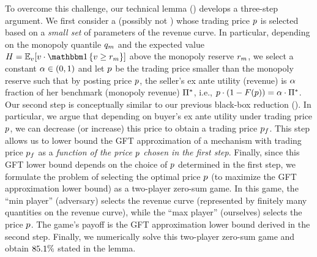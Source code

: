 To overcome this challenge, our technical lemma () develops a three-step argument. We first consider a (possibly not {\ksfair}) {\FixPrice} whose trading price $p$ is selected based on a \emph{small set} of parameters of the revenue curve. In particular, depending on the monopoly quantile $q_m$ and the expected value $H = \expect[\val]{\val\cdot \indicator{\val \geq \optreserve}}$ above the monopoly reserve $r_m$, we select a constant $\alpha\in(0, 1)$ and let $p$ be the trading price smaller than the monopoly reserve such that by posting price $p$, the seller's ex ante utility (revenue) is $\alpha$ fraction of her benchmark (monopoly revenue) $\Pi^*$, i.e., $p\cdot(1 - F(p)) = \alpha\cdot \Pi^*$. Our second step is conceptually similar to our previous black-box reduction (). In particular, we argue that depending on buyer's ex ante utility under trading price $p$, we can decrease (or increase) this price to obtain a {\ksfair} trading price $p_f$. This step allows us to lower bound the GFT approximation of a {\ksfair} {\FixPrice} mechanism with trading price $p_f$ as a \emph{function of the price $p$ chosen in the first step}. Finally, since this GFT lower bound depends on the choice of $p$ determined in the first step, we formulate the problem of selecting the optimal price $p$ (to maximize the GFT approximation lower bound) as a two-player zero-sum game. In this game, the ``min player'' (adversary) selects the revenue curve (represented by finitely many quantities on the revenue curve), while the ``max player'' (ourselves) selects the price $p$. The game's payoff is the GFT approximation lower bound derived in the second step. Finally, we numerically solve this two-player zero-sum game and obtain ${85.1\%}$ stated in the lemma. 


